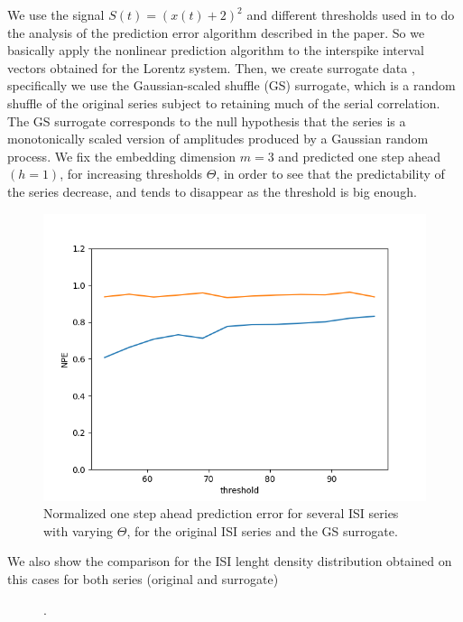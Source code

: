 \documentclass[10pt]{article}
\begin{document}
We use the signal $S(t)=(x(t)+2)^2$ and different thresholds used in \cite{interspike} to do the analysis of the prediction error algorithm described in the paper. So we basically apply the nonlinear prediction algorithm to the interspike interval vectors obtained for the Lorentz system. Then, we create surrogate data \cite{surrogate}, specifically we use the Gaussian-scaled shuffle (GS) surrogate, which is a random shuffle of the original series subject to retaining much of the serial correlation. The GS surrogate corresponds to the null hypothesis that the series is a monotonically scaled version of amplitudes produced by a Gaussian random process. We fix the embedding dimension $m=3$ and predicted one step ahead $(h=1)$, for increasing thresholds $\Theta$, in order to see that the predictability of the series decrease, and tends to disappear as the threshold is big enough.

\begin{figure}[h!]
\centering
\includegraphics[scale=0.5]{NPE_12series}
\caption{Normalized one step ahead prediction error for several ISI series with varying $\Theta$, for the original ISI series and the GS surrogate.}
\label{fig:12series}
\end{figure}

We also show the comparison for the ISI lenght density distribution obtained on this cases for both series (original and surrogate)

\begin{figure}[h!]
\centering
\caption{.}
\label{fig:distributions}
\end{figure}
\end{document}
